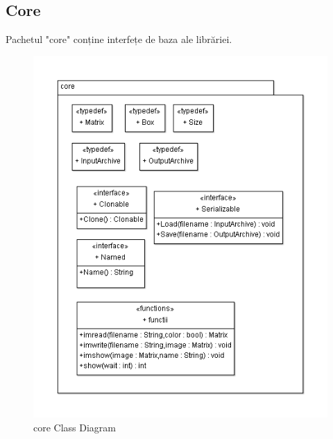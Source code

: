 \subsection{Core}
Pachetul "core" conține interfețe de baza ale librăriei.
\begin{figure}[H]
	\centering
		\includegraphics[width=1.00\textwidth]{uml/coreClassDiagram.png}
	\caption{core Class Diagram}
	\label{fig:coreClassDiagram}
\end{figure}

